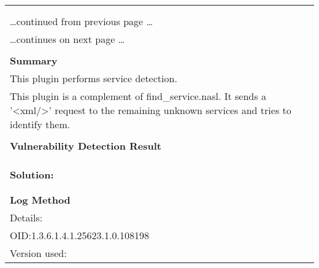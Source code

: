 \documentclass{article}
\begin{document}
\begin{longtable}{|p{}|}
\hline
\rowcolor{gvm_log}{\color{white}{Log (CVSS: 0.0) }}\\
\rowcolor{gvm_log}{\color{white}{NVT: Service Detection with '<xml/>' Request}}\\
\hline
\endfirsthead
\hfill\ldots continued from previous page \ldots \\
\hline
\endhead
\hline
\ldots continues on next page \ldots \\
\endfoot
\hline
\endlastfoot
\\
\textbf{Summary}\\
This plugin performs service detection.\\
  This plugin is a complement of find\_service.nasl. It sends a '<xml/>'
  request to the remaining unknown services and tries to identify them.\\

        \hline
        \\
\textbf{Vulnerability Detection Result}\\
\rowcolor{white}{\verb=A OpenVAS / Greenbone Vulnerability Manager supporting the OMP/GMP protocol seem=}\\
\rowcolor{white}{$\hookrightarrow$\verb=s to be running on this port.=}\\

          \hline
          \\
\textbf{Solution:}\\
\\


        \hline
        \\
\textbf{Log Method}\\
Details:
\rowcolor{white}{\verb=Service Detection with '<xml/>' Request=}\\
OID:1.3.6.1.4.1.25623.1.0.108198\\
Version used:
\rowcolor{white}{\verb=2022-02-01T12:51:06Z=}\\
\end{longtable}
\end{document}
